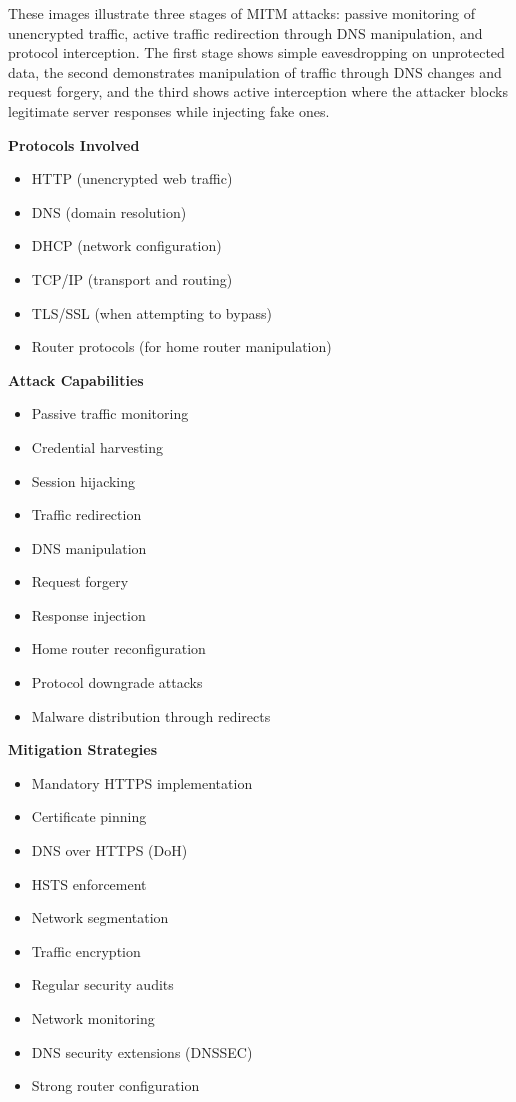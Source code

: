 These images illustrate three stages of MITM attacks: passive monitoring of unencrypted traffic, active traffic redirection through DNS manipulation, and protocol interception. The first stage shows simple eavesdropping on unprotected data, the second demonstrates manipulation of traffic through DNS changes and request forgery, and the third shows active interception where the attacker blocks legitimate server responses while injecting fake ones.

\textbf{Protocols Involved}
\begin{itemize}
    \item HTTP (unencrypted web traffic)
    \item DNS (domain resolution)
    \item DHCP (network configuration)
    \item TCP/IP (transport and routing)
    \item TLS/SSL (when attempting to bypass)
    \item Router protocols (for home router manipulation)
\end{itemize}

\textbf{Attack Capabilities}
\begin{itemize}
    \item Passive traffic monitoring
    \item Credential harvesting
    \item Session hijacking
    \item Traffic redirection
    \item DNS manipulation
    \item Request forgery
    \item Response injection
    \item Home router reconfiguration
    \item Protocol downgrade attacks
    \item Malware distribution through redirects
\end{itemize}

\textbf{Mitigation Strategies}
\begin{itemize}
    \item Mandatory HTTPS implementation
    \item Certificate pinning
    \item DNS over HTTPS (DoH)
    \item HSTS enforcement
    \item Network segmentation
    \item Traffic encryption
    \item Regular security audits
    \item Network monitoring
    \item DNS security extensions (DNSSEC)
    \item Strong router configuration
\end{itemize}

